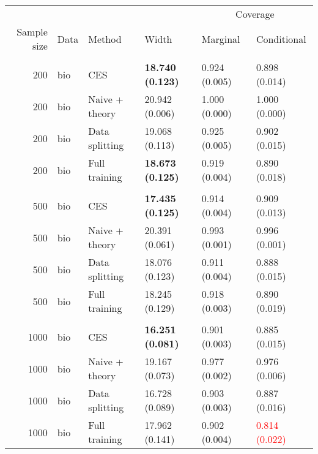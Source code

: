 
\begin{tabular}{rlllll}
\toprule
\multicolumn{4}{c}{ } & \multicolumn{2}{c}{Coverage} \\
\cmidrule(l{3pt}r{3pt}){5-6}
Sample size & Data & Method & Width & Marginal & Conditional\\
\midrule
\addlinespace[0.3em]
\multicolumn{6}{l}{\textbf{200}}\\
\hspace{1em}200 & bio & CES & \textbf{18.740 (0.123)} & 0.924 (0.005) & 0.898 (0.014)\\
\hspace{1em}200 & bio & Naive + theory & 20.942 (0.006) & 1.000 (0.000) & 1.000 (0.000)\\
\hspace{1em}200 & bio & Data splitting & 19.068 (0.113) & 0.925 (0.005) & 0.902 (0.015)\\
\hspace{1em}200 & bio & Full training & \textbf{18.673 (0.125)} & 0.919 (0.004) & 0.890 (0.018)\\
\addlinespace[0.3em]
\multicolumn{6}{l}{\textbf{500}}\\
\hspace{1em}500 & bio & CES & \textbf{17.435 (0.125)} & 0.914 (0.004) & 0.909 (0.013)\\
\hspace{1em}500 & bio & Naive + theory & 20.391 (0.061) & 0.993 (0.001) & 0.996 (0.001)\\
\hspace{1em}500 & bio & Data splitting & 18.076 (0.123) & 0.911 (0.004) & 0.888 (0.015)\\
\hspace{1em}500 & bio & Full training & 18.245 (0.129) & 0.918 (0.003) & 0.890 (0.019)\\
\addlinespace[0.3em]
\multicolumn{6}{l}{\textbf{1000}}\\
\hspace{1em}1000 & bio & CES & \textbf{16.251 (0.081)} & 0.901 (0.003) & 0.885 (0.015)\\
\hspace{1em}1000 & bio & Naive + theory & 19.167 (0.073) & 0.977 (0.002) & 0.976 (0.006)\\
\hspace{1em}1000 & bio & Data splitting & 16.728 (0.089) & 0.903 (0.003) & 0.887 (0.016)\\
\hspace{1em}1000 & bio & Full training & 17.962 (0.141) & 0.902 (0.004) & \textcolor{red}{0.814 (0.022)}\\

\end{tabular}
